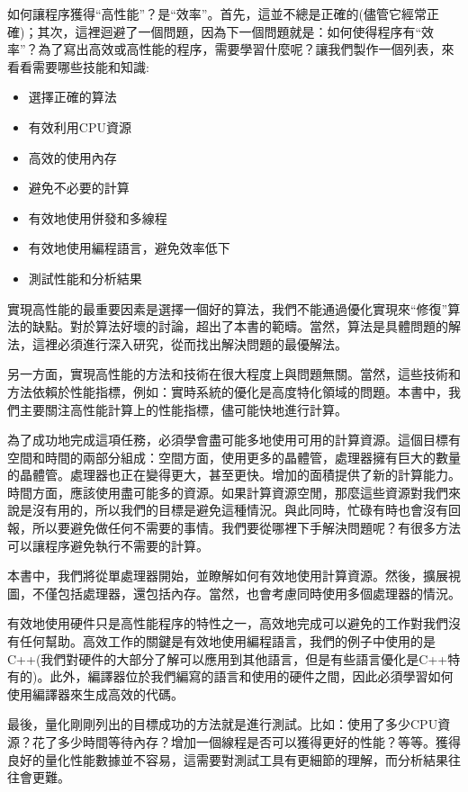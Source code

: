 如何讓程序獲得“高性能”？是“效率”。首先，這並不總是正確的(儘管它經常正確)；其次，這裡迴避了一個問題，因為下一個問題就是：如何使得程序有“效率”？為了寫出高效或高性能的程序，需要學習什麼呢？讓我們製作一個列表，來看看需要哪些技能和知識:

\begin{itemize}
\item 選擇正確的算法
\item 有效利用CPU資源
\item 高效的使用內存
\item 避免不必要的計算
\item 有效地使用併發和多線程
\item 有效地使用編程語言，避免效率低下
\item 測試性能和分析結果
\end{itemize}

實現高性能的最重要因素是選擇一個好的算法，我們不能通過優化實現來“修復”算法的缺點。對於算法好壞的討論，超出了本書的範疇。當然，算法是具體問題的解法，這裡必須進行深入研究，從而找出解決問題的最優解法。

另一方面，實現高性能的方法和技術在很大程度上與問題無關。當然，這些技術和方法依賴於性能指標，例如：實時系統的優化是高度特化領域的問題。本書中，我們主要關注高性能計算上的性能指標，儘可能快地進行計算。

為了成功地完成這項任務，必須學會盡可能多地使用可用的計算資源。這個目標有空間和時間的兩部分組成：空間方面，使用更多的晶體管，處理器擁有巨大的數量的晶體管。處理器也正在變得更大，甚至更快。增加的面積提供了新的計算能力。時間方面，應該使用盡可能多的資源。如果計算資源空閒，那麼這些資源對我們來說是沒有用的，所以我們的目標是避免這種情況。與此同時，忙碌有時也會沒有回報，所以要避免做任何不需要的事情。我們要從哪裡下手解決問題呢？有很多方法可以讓程序避免執行不需要的計算。

本書中，我們將從單處理器開始，並瞭解如何有效地使用計算資源。然後，擴展視圖，不僅包括處理器，還包括內存。當然，也會考慮同時使用多個處理器的情況。

有效地使用硬件只是高性能程序的特性之一，高效地完成可以避免的工作對我們沒有任何幫助。高效工作的關鍵是有效地使用編程語言，我們的例子中使用的是C++(我們對硬件的大部分了解可以應用到其他語言，但是有些語言優化是C++特有的)。此外，編譯器位於我們編寫的語言和使用的硬件之間，因此必須學習如何使用編譯器來生成高效的代碼。

最後，量化剛剛列出的目標成功的方法就是進行測試。比如：使用了多少CPU資源？花了多少時間等待內存？增加一個線程是否可以獲得更好的性能？等等。獲得良好的量化性能數據並不容易，這需要對測試工具有更細節的理解，而分析結果往往會更難。

